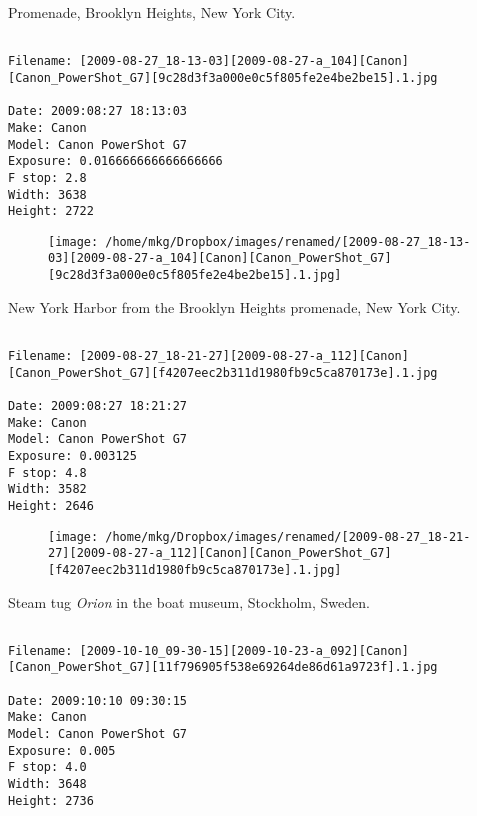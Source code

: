 \clearpage
\onecolumn
\noindent Promenade, Brooklyn Heights, New York City.
\noindent
\begin{lstlisting}

Filename: [2009-08-27_18-13-03][2009-08-27-a_104][Canon][Canon_PowerShot_G7][9c28d3f3a000e0c5f805fe2e4be2be15].1.jpg

Date: 2009:08:27 18:13:03
Make: Canon
Model: Canon PowerShot G7
Exposure: 0.016666666666666666
F stop: 2.8
Width: 3638
Height: 2722
\end{lstlisting}
\clearpage

\begin{figure}
\texttt{[image: /home/mkg/Dropbox/images/renamed/[2009-08-27\_18-13-03][2009-08-27-a\_104][Canon][Canon\_PowerShot\_G7][9c28d3f3a000e0c5f805fe2e4be2be15].1.jpg]}
\end{figure}
    
\clearpage
\onecolumn
\noindent New York Harbor from the Brooklyn Heights promenade, New York City.
\noindent
\begin{lstlisting}

Filename: [2009-08-27_18-21-27][2009-08-27-a_112][Canon][Canon_PowerShot_G7][f4207eec2b311d1980fb9c5ca870173e].1.jpg

Date: 2009:08:27 18:21:27
Make: Canon
Model: Canon PowerShot G7
Exposure: 0.003125
F stop: 4.8
Width: 3582
Height: 2646
\end{lstlisting}
\clearpage

\begin{figure}
\texttt{[image: /home/mkg/Dropbox/images/renamed/[2009-08-27\_18-21-27][2009-08-27-a\_112][Canon][Canon\_PowerShot\_G7][f4207eec2b311d1980fb9c5ca870173e].1.jpg]}
\end{figure}
    
\clearpage
\onecolumn
\noindent Steam tug \emph{Orion} in the boat museum, Stockholm, Sweden.
\noindent
\begin{lstlisting}

Filename: [2009-10-10_09-30-15][2009-10-23-a_092][Canon][Canon_PowerShot_G7][11f796905f538e69264de86d61a9723f].1.jpg

Date: 2009:10:10 09:30:15
Make: Canon
Model: Canon PowerShot G7
Exposure: 0.005
F stop: 4.0
Width: 3648
Height: 2736
\end{lstlisting}
\clearpage


